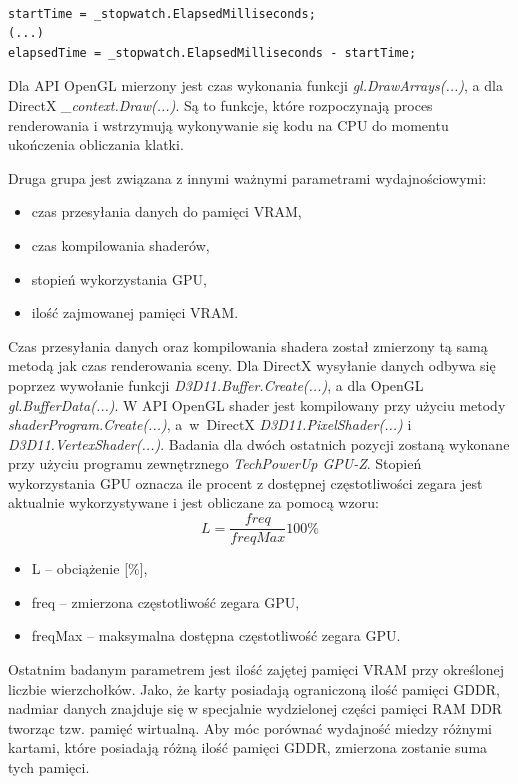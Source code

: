 \documentclass[archive]{mgr}
\begin{document}
\begin{lstlisting}[caption={Klasa StopWatch – przykładowe użycie},captionpos=b,label={lab:stopwatch}]

startTime = _stopwatch.ElapsedMilliseconds;
(...)
elapsedTime = _stopwatch.ElapsedMilliseconds - startTime;
\end{lstlisting}

Dla API OpenGL mierzony jest czas wykonania funkcji \emph{gl.DrawArrays(...)}, a dla DirectX \emph{\_context.Draw(...)}. Są to funkcje, które rozpoczynają proces renderowania i wstrzymują wykonywanie się kodu na CPU do momentu ukończenia obliczania klatki.

Druga grupa jest związana z innymi ważnymi parametrami wydajnościowymi:


\begin{itemize}
  \item czas przesyłania danych do pamięci VRAM,
  \item czas kompilowania shaderów,
  \item stopień wykorzystania GPU,
  \item ilość zajmowanej pamięci VRAM.
\end{itemize}


Czas przesyłania danych oraz kompilowania shadera został zmierzony tą samą metodą jak czas renderowania sceny. Dla DirectX wysyłanie danych odbywa się poprzez wywołanie funkcji \emph{D3D11.Buffer.Create(...)}, a dla OpenGL \emph{gl.BufferData(...)}. W API OpenGL shader jest kompilowany przy użyciu metody \emph{shaderProgram.Create(...)}, a~w~DirectX \emph{D3D11.PixelShader(...)} i \emph{D3D11.VertexShader(...)}. Badania dla dwóch ostatnich pozycji zostaną wykonane przy użyciu programu zewnętrznego \emph{TechPowerUp GPU-Z}. Stopień wykorzystania GPU oznacza ile procent z dostępnej częstotliwości zegara jest aktualnie wykorzystywane i jest obliczane za pomocą wzoru:
\begin{equation} 
\label{metric}
L = \frac{freq}{freqMax}100\%
\end{equation}
\begin{itemize}
  \item L – obciążenie [\%],
  \item freq – zmierzona częstotliwość zegara GPU,
  \item freqMax – maksymalna dostępna częstotliwość zegara GPU.
\end{itemize}

Ostatnim badanym parametrem jest ilość zajętej pamięci VRAM przy określonej liczbie wierzchołków. Jako, że karty posiadają ograniczoną ilość pamięci GDDR, nadmiar danych znajduje się w specjalnie wydzielonej części pamięci RAM DDR tworząc tzw. pamięć wirtualną. Aby móc porównać wydajność miedzy różnymi kartami, które posiadają różną ilość pamięci GDDR, zmierzona zostanie suma tych pamięci.\\
\end{document}
